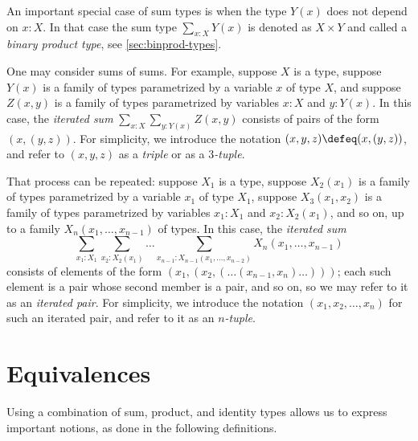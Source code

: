 \begin{remark}
  \label{rem:non-dependent-sums}
  An important special case of sum types is when the type $Y(x)$ does
  not depend on $x:X$. In that case the sum type $\sum _{x:X} Y(x)$
  is denoted as $X\times Y$ and called a \emph{binary product type},
  see \cref{sec:binprod-types}.
\end{remark}

\begin{remark}
  \label{rem:iterated-sums}
  One may consider sums of sums.  For example, suppose $X$ is a type, suppose $Y(x)$ is a family of types parametrized by a variable $x$ of type $X$,
  and suppose $Z(x,y)$ is a family of types parametrized by variables $x:X$ and $y:Y(x)$.  In this case, the \emph{iterated sum}
  $\sum_{x:X} \sum_{y:Y(x)} Z(x,y)$ consists of pairs of the form $(x,(y,z))$.  For simplicity, we introduce the notation
  $(x,y,z) \defeq (x,(y,z))$, and refer to $(x,y,z)$ as a \emph{triple} or as a \emph{$3$-tuple}.

That process can be repeated: suppose $X_1$ is a type, suppose $X_2(x_1)$
is a family of types parametrized by a variable $x_1$ of type $X_1$,
suppose $X_3(x_1,x_2)$ is a family of types parametrized by variables
$x_1:X_1$ and $x_2:X_2(x_1)$, and so on, up to a family
  $X_n(x_1,\dots,x_{n-1})$ of types.  In this case, the \emph{iterated sum}
  $$\sum _{x_1:X_1} \sum_{x_2:X_2(x_1)} \dots \sum_{x_{n-1}:X_{n-1}(x_1,\dots,x_{n-2})} X_n(x_1,\dots,x_{n-1}) $$
  consists of elements of the form
  $(x_1,(x_2,(\dots (x_{n-1},x_n)\dots)))$; each such element is a pair whose second member is a pair, and so on, so we may refer to it as an \emph{iterated pair}.
  For simplicity, we introduce the notation $(x_1,x_2,\dots,x_n)$ for such an iterated pair, and refer to it as an \emph{$n$-tuple}.
\end{remark}

\section{Equivalences}\label{sec:equivalence}

Using a combination of sum, product, and identity types allows
us to express important notions, as done in the following
definitions.

